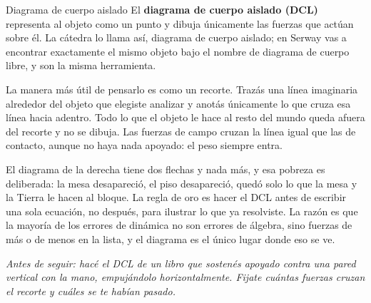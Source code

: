 \documentclass[11pt,openany]{book}
\begin{document}
\begin{bloque}{Diagrama de cuerpo aislado}
El \textbf{diagrama de cuerpo aislado (DCL)} representa al objeto como un punto y dibuja únicamente las fuerzas que actúan sobre él. La cátedra lo llama así, diagrama de cuerpo aislado; en Serway vas a encontrar exactamente el mismo objeto bajo el nombre de diagrama de cuerpo libre, y son la misma herramienta.

La manera más útil de pensarlo es como un recorte. Trazás una línea imaginaria alrededor del objeto que elegiste analizar y anotás únicamente lo que cruza esa línea hacia adentro. Todo lo que el objeto le hace al resto del mundo queda afuera del recorte y no se dibuja. Las fuerzas de campo cruzan la línea igual que las de contacto, aunque no haya nada apoyado: el peso siempre entra.

\begin{center}
\end{center}

El diagrama de la derecha tiene dos flechas y nada más, y esa pobreza es deliberada: la mesa desapareció, el piso desapareció, quedó solo lo que la mesa y la Tierra le hacen al bloque. La regla de oro es hacer el DCL antes de escribir una sola ecuación, no después, para ilustrar lo que ya resolviste. La razón es que la mayoría de los errores de dinámica no son errores de álgebra, sino fuerzas de más o de menos en la lista, y el diagrama es el único lugar donde eso se ve.

\textit{Antes de seguir: hacé el DCL de un libro que sostenés apoyado contra una pared vertical con la mano, empujándolo horizontalmente. Fijate cuántas fuerzas cruzan el recorte y cuáles se te habían pasado.}
\end{bloque}
\end{document}
